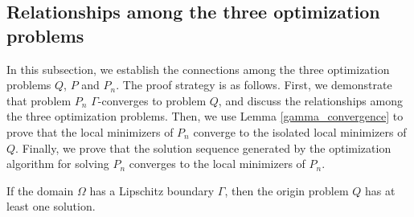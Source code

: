 \documentclass{amsart}
\begin{document}
\subsection{Relationships among the three optimization problems}
In this subsection, we establish the connections among the three optimization problems $Q$, $P$ and $P_n$. The proof strategy is as follows. First, we demonstrate that problem \( P_n \) \(\Gamma\)-converges to problem \( Q \), and discuss the relationships among the three optimization problems. Then, we use Lemma \ref{gamma_convergence} to prove that the local minimizers of \( P_n \) converge to the isolated local minimizers of \( Q \). Finally, we prove that the solution sequence generated by the optimization algorithm for solving \( P_n \) converges to the local minimizers of \( P_n \).

\begin{lemma}
    If the domain $\Omega$ has a Lipschitz boundary \(\Gamma\), then the origin problem \( Q \) has at least one solution.
\end{lemma}
\end{document}
